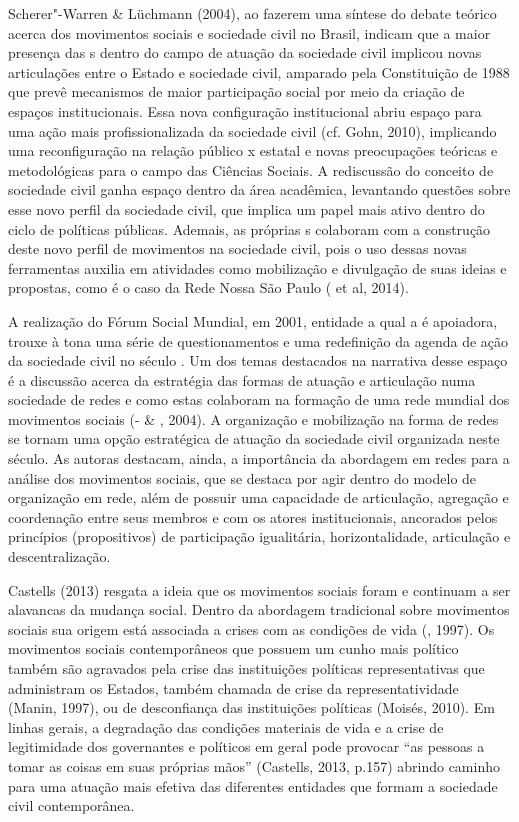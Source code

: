 Scherer"-Warren \& Lüchmann (2004), ao fazerem uma síntese do debate
teórico acerca dos movimentos sociais e sociedade civil no Brasil,
indicam que a maior presença das s dentro do campo de atuação da
sociedade civil implicou novas articulações entre o Estado e sociedade
civil, amparado pela Constituição de 1988 que prevê mecanismos de maior
participação social por meio da criação de espaços institucionais. Essa
nova configuração institucional abriu espaço para uma ação mais
profissionalizada da sociedade civil (cf. Gohn, 2010), implicando uma
reconfiguração na relação público x estatal e novas preocupações
teóricas e metodológicas para o campo das Ciências Sociais. A
rediscussão do conceito de sociedade civil ganha espaço dentro da área
acadêmica, levantando questões sobre esse novo perfil da sociedade
civil, que implica um papel mais ativo dentro do ciclo de políticas
públicas. Ademais, as próprias s colaboram com a construção deste
novo perfil de movimentos na sociedade civil, pois o uso dessas novas
ferramentas auxilia em atividades como mobilização e divulgação de suas
ideias e propostas, como é o caso da Rede Nossa São Paulo ( et
al, 2014).

A realização do Fórum Social Mundial, em 2001, entidade a qual a  é
apoiadora, trouxe à tona uma série de questionamentos e uma redefinição
da agenda de ação da sociedade civil no século . Um dos temas
destacados na narrativa desse espaço é a discussão acerca da estratégia
das formas de atuação e articulação numa sociedade de redes e como estas
colaboram na formação de uma rede mundial dos movimentos sociais
(- \& , 2004). A organização e mobilização na forma
de redes se tornam uma opção estratégica de atuação da sociedade civil
organizada neste século. As autoras destacam, ainda, a importância da
abordagem em redes para a análise dos movimentos sociais, que se destaca
por agir dentro do modelo de organização em rede, além de possuir uma
capacidade de articulação, agregação e coordenação entre seus membros e
com os atores institucionais, ancorados pelos princípios (propositivos)
de participação igualitária, horizontalidade, articulação e
descentralização.

Castells (2013) resgata a ideia que os movimentos sociais foram e
continuam a ser alavancas da mudança social. Dentro da abordagem
tradicional sobre movimentos sociais sua origem está associada a crises
com as condições de vida (, 1997). Os movimentos sociais
contemporâneos que possuem um cunho mais político também são agravados
pela crise das instituições políticas representativas que administram os
Estados, também chamada de crise da representatividade (Manin, 1997), ou
de desconfiança das instituições políticas (Moisés, 2010). Em linhas
gerais, a degradação das condições materiais de vida e a crise de
legitimidade dos governantes e políticos em geral pode provocar ``as
pessoas a tomar as coisas em suas próprias mãos'' (Castells, 2013, p.157)
abrindo caminho para uma atuação mais efetiva das diferentes entidades
que formam a sociedade civil contemporânea.

